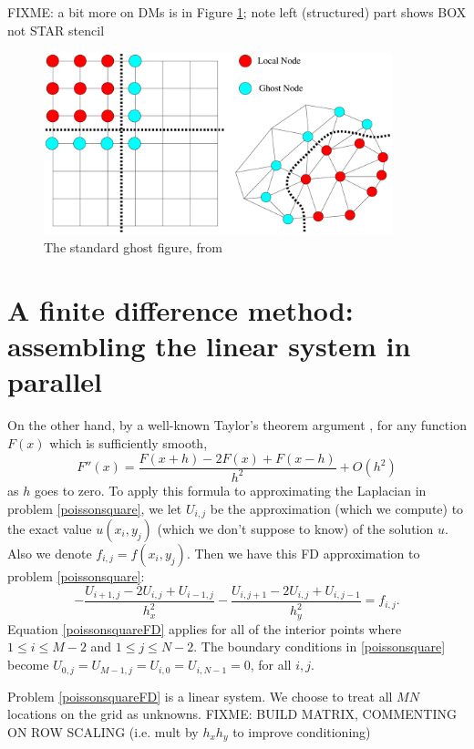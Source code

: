 FIXME: a bit more on DMs is in Figure \ref{fig:petscghostvalues}; note left (structured) part shows BOX not STAR stencil

\begin{figure}
\includegraphics[width=0.9\textwidth]{petscghostvalues}
\caption{The standard \PETSc ghost figure, from }
\label{fig:petscghostvalues}
\end{figure}


\section{A finite difference method: assembling the linear system in parallel}

On the other hand, by a well-known Taylor's theorem argument \citep{MortonMayers}, for any function $F(x)$ which is sufficiently smooth,
    $$F''(x) = \frac{F(x+h) - 2 F(x) + F(x-h)}{h^2} + O(h^2)$$
as $h$ goes to zero.  To apply this formula to approximating the Laplacian in problem \eqref{poissonsquare}, we let $U_{i,j}$ be the approximation (which we compute) to the exact value $u(x_i,y_j)$ (which we don't suppose to know) of the solution $u$.  Also we denote $f_{i,j} = f(x_i,y_j)$.  Then we have this FD approximation to problem \eqref{poissonsquare}:
\begin{equation}
- \frac{U_{i+1,j} - 2 U_{i,j} + U_{i-1,j}}{h_x^2} - \frac{U_{i,j+1} - 2 U_{i,j} + U_{i,j-1}}{h_y^2} = f_{i,j}. \label{poissonsquareFD}
\end{equation}
Equation \eqref{poissonsquareFD} applies for all of the interior points where $1 \le i \le M-2$ and $1 \le j \le N-2$.  The boundary conditions in \eqref{poissonsquare} become $U_{0,j} = U_{M-1,j} = U_{i,0} = U_{i,N-1} = 0$, for all $i,j$.

Problem \eqref{poissonsquareFD} is a linear system.  We choose to treat all $MN$ locations on the grid as unknowns. FIXME: BUILD MATRIX, COMMENTING ON ROW SCALING (i.e. mult by $h_x h_y$ to improve conditioning)


